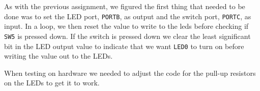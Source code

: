 As with the previous assignment, we figured the first thing that needed to be done was to set the LED port, \texttt{PORTB}, as output and the switch port, \texttt{PORTC}, as input. In a loop, we then reset the value to write to the leds before checking if \texttt{SW5} is pressed down. If the switch is pressed down we clear the least significant bit in the LED output value to indicate that we want \texttt{LED0} to turn on before writing the value out to the LEDs.

When testing on hardware we needed to adjust the code for the pull-up resistors on the LEDs to get it to work.
